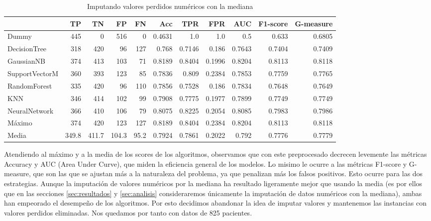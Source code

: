 \documentclass{article}
\begin{document}
\begin{table}[H]
\centering
\caption{Imputando valores perdidos numéricos con la mediana}
\label{tab:impute-median}
\begin{tabular}{|lrrrrrrrrrr|}
\hline
 & TP & TN & FP & FN & Acc & TPR & FPR & AUC & F1-score & G-measure\\ \hline
Dummy & 445 & 0 & 516 & 0 & 0.4631 & 1.0 & 1.0 & 0.5 & 0.633 & 0.6805\\
DecisionTree & 318 & 420 & 96 & 127 & 0.768 & 0.7146 & 0.186 & 0.7643 & 0.7404 & 0.7409\\
GaussianNB & 374 & 413 & 103 & 71 & 0.8189 & 0.8404 & 0.1996 & 0.8204 & 0.8113 & 0.8118\\
SupportVectorM & 360 & 393 & 123 & 85 & 0.7836 & 0.809 & 0.2384 & 0.7853 & 0.7759 & 0.7765\\
RandomForest & 335 & 420 & 96 & 110 & 0.7856 & 0.7528 & 0.186 & 0.7834 & 0.7648 & 0.7649\\
KNN & 346 & 414 & 102 & 99 & 0.7908 & 0.7775 & 0.1977 & 0.7899 & 0.7749 & 0.7749\\
NeuralNetwork & 366 & 410 & 106 & 79 & 0.8075 & 0.8225 & 0.2054 & 0.8085 & 0.7983 & 0.7986\\ \hline
Máximo & 374 & 420 & 123 & 127 & 0.8189 & 0.8404 & 0.2384 & 0.8204 & 0.8113 & 0.8118\\
Media & 349.8 & 411.7 & 104.3 & 95.2 & 0.7924 & 0.7861 & 0.2022 & 0.792 & 0.7776 & 0.7779\\
\hline
\end{tabular}
\end{table}

Atendiendo al máximo y a la media de los scores de los algoritmos,
observamos que con este preprocesado decrecen levemente las métricas
Accuracy y AUC (Area Under Curve), que miden la eficiencia general de
los modelos. Lo misimo le ocurre a las métricas F1-score y G-measure,
que son las que se ajustan más a la naturaleza del problema, ya que
penalizan más los falsos positivos. Esto ocurre para las dos
estrategias. Aunque la imputación de valores numéricos por la mediana
ha resultado ligeramente mejor que usando la media (es por ellos que
en las secciones \ref{sec:resultados} y \ref{sec:analisis}
consideraremos únicamente la imputación de datos numéricos con la
mediana), ambas han empeorado el desempeño de los algoritmos. Por esto
decidimos abandonar la idea de imputar valores y mantenemos las
instancias con valores perdidos eliminadas. Nos quedamos por tanto con
datos de 825 pacientes.
\end{document}
